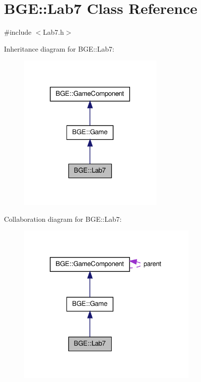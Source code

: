 \hypertarget{class_b_g_e_1_1_lab7}{\section{B\-G\-E\-:\-:Lab7 Class Reference}
\label{class_b_g_e_1_1_lab7}
}


{\ttfamily \#include $<$Lab7.\-h$>$}



Inheritance diagram for B\-G\-E\-:\-:Lab7\-:
\nopagebreak
\begin{figure}[H]
\begin{center}
\leavevmode
\includegraphics[width=200pt]{class_b_g_e_1_1_lab7__inherit__graph}
\end{center}
\end{figure}


Collaboration diagram for B\-G\-E\-:\-:Lab7\-:
\nopagebreak
\begin{figure}[H]
\begin{center}
\leavevmode
\includegraphics[width=249pt]{class_b_g_e_1_1_lab7__coll__graph}
\end{center}
\end{figure}
